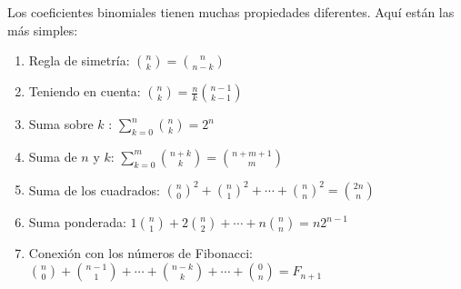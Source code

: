 Los coeficientes binomiales tienen muchas propiedades diferentes. Aquí están las más simples:

\begin{enumerate}
	\item Regla de simetría: $\binom n k = \binom n {n-k}$
	\item Teniendo en cuenta: $\binom n k = \frac n k \binom {n-1} {k-1}$
	\item Suma sobre $k$ : $\sum_{k = 0}^n \binom n k = 2 ^ n$
	\item Suma de $n$ y $k$: $\sum_{k = 0}^m \binom {n + k} k = \binom {n + m + 1} m$
	\item Suma de los cuadrados: ${\binom n 0}^2 + {\binom n 1}^2 + \cdots + {\binom n n}^2 = \binom {2n} n$
	\item Suma ponderada: $1 \binom n 1 + 2 \binom n 2 + \cdots + n \binom n n = n 2^{n-1}$
	\item Conexión con los números de Fibonacci: $\binom n 0 + \binom {n-1} 1 + \cdots + \binom {n-k} k + \cdots + \binom 0 n = F_{n+1}$
\end{enumerate}